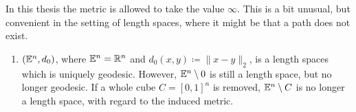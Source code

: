 \begin{rem}
  In this thesis the metric is allowed to take the value \(\infty\). This is a bit unusual, but convenient in the setting of length spaces, where it might be that a path does not exist.
\end{rem}

\begin{bsp}
  \begin{enumerate}
  \item \((\mathbb{E}^n, d_0)\), where \(\mathbb{E}^n = \mathbb{R}^n\) and \(d_0(x,y) \coloneqq \|x - y\|_2\), is a length spaces which is uniquely geodesic. However, \(\mathbb{E}^n \setminus {0}\) is still a length space, but no longer geodesic. If a whole cube \(C= [0,1]^n\) is removed, \(\mathbb{E}^n \setminus C\) is no longer a length space, with regard to the induced metric. 
  \end{enumerate}
\end{bsp}


